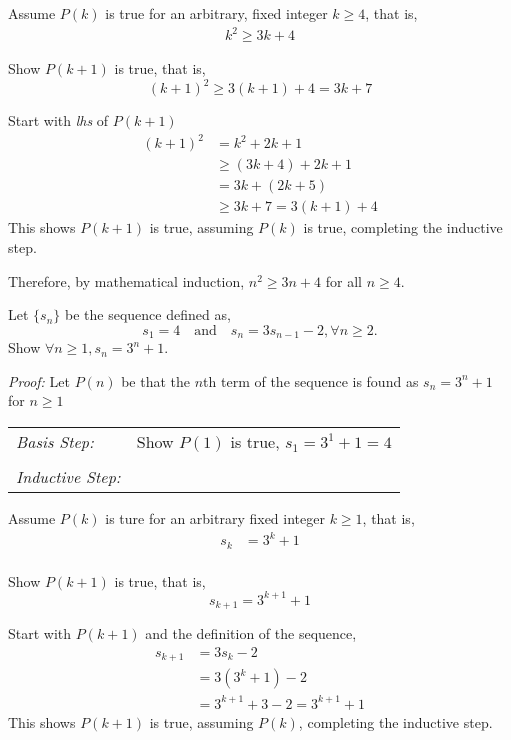 \documentclass[10pt,addpoints]{exam}
\begin{document}
\begin{questions}
\begin{solution}
	Assume $P(k)$ is true for an arbitrary, fixed integer $k \geq 4$, that is, 
	\begin{align*}
		k^2 \geq 3k + 4 \tag{IH} 
	\end{align*}

	Show $P(k+1)$ is true, that is, 
	\[ (k+1)^2 \geq 3(k+1) + 4 = 3k + 7 \]

	Start with \textit{lhs} of $P(k+1)$
	\begin{align*}
		(k+1)^2 &= k^2 + 2k + 1 \\
		 &\geq (3k + 4) + 2k + 1 \tag{IH} \\
		 &= 3k + (2k + 5) \\
		 &\geq 3k + 7 = 3(k+1) + 4
	\end{align*}
	This shows $P(k+1)$ is true, assuming $P(k)$ is true, completing the inductive step. 

	Therefore, by mathematical induction, $n^2 \geq 3n + 4$ for all $n \geq 4$.
\end{solution}



\question[12] Let $\{s_n\}$ be the sequence defined as, 
\[ s_1 = 4 \quad \text{and} \quad s_n = 3s_{n-1} - 2, \forall n \geq 2. \]
Show $\forall n \geq 1, s_n = 3^n + 1.$
    \ifprintanswers
        \vspace{-10pt}
   \fi
\begin{solution}
	\textit{Proof:}
	Let $P(n)$ be that the $n$th term of the sequence is found as $s_n = 3^n + 1$ for $n \geq 1$

	\smallskip
	\begin{tabular}{lp{4in}}
	  \textit{Basis Step:} & Show $P(1)$ is true, $s_1 = 3^1 + 1 = 4$ \\
	   & \\
	 \textit{Inductive Step:} &  \\
	\end{tabular}

	Assume $P(k)$ is ture for an arbitrary fixed integer $k \geq 1$, that is, 
	\begin{align*}
		s_k &= 3^k + 1 \tag{IH} \\
	\end{align*}

	Show $P(k+1)$ is true, that is,
	\[ s_{k+1} = 3^{k+1} + 1 \]

	Start with $P(k+1)$ and the definition of the sequence, 
	\begin{align*}
		s_{k+1} &= 3s_{k} - 2 \\
		&= 3(3^k + 1) - 2 \tag{IH}\\
		&= 3^{k+1} + 3 - 2 = 3^{k+1} + 1
	\end{align*}
	This shows $P(k+1)$ is true, assuming $P(k)$, completing the inductive step.


\end{solution}
\end{questions}
\end{document}
